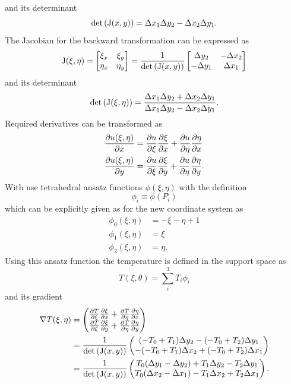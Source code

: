 and its determinant
\begin{equation}
	\det\left(\mathrm{J}(x, y)\right) = \Delta x_1 \Delta y_2 - \Delta x_2 \Delta y_1.
\end{equation}
The Jacobian for the backward transformation can be expressed as
\begin{equation}
	\mathrm{J}(\xi, \eta) = 
	\begin{bmatrix}
	\xi_{x} & \xi_{y} \\
	\eta_{x} & \eta_{y}
	\end{bmatrix}
	= \frac{1}{\det\left(\mathrm{J}(x,y)\right)}
	\begin{bmatrix}
	\Delta y_{2} & -\Delta x_{2}\\
	-\Delta y_{1} & \Delta x_{1}
	\end{bmatrix}
\end{equation}
and its determinant
\begin{equation}
	\det\left( \mathrm{J}(\xi, \eta) \right) = \frac{\Delta x_1 \Delta y_2 + \Delta x_2 \Delta y_1}{\Delta x_1 \Delta y_2 - \Delta x_2 \Delta y_1}.
\end{equation}
Required derivatives can be transformed as
\begin{align}
	\pdv{u(\xi, \eta)}{x} &= \pdv{u}{\xi}\pdv{\xi}{x} + \pdv{u}{\eta}\pdv{\eta}{x}\\
	\pdv{u(\xi, \eta)}{y} &= \pdv{u}{\xi}\pdv{\xi}{y} + \pdv{u}{\eta}\pdv{\eta}{y}.
\end{align}
With use tetrahedral ansatz functions $\phi(\xi, \eta)$ with the definition
\begin{equation}
	\phi_i \equiv \phi(P_i)
\end{equation}
which can be explicitly given as for the new coordinate system as
\begin{align}
	\phi_0(\xi, \eta) &= -\xi - \eta  + 1\\
	\phi_1(\xi, \eta) &= \xi\\
	\phi_2(\xi, \eta) &= \eta.
\end{align}
Using this ansatz function the temperature is defined in the support space as
\begin{equation}
	T(\xi, \theta)  = \sum_i^3 T_i \phi_i
\end{equation}
and its gradient
\begin{align}
	\nabla T(\xi, \eta) &=
	\begin{pmatrix}
	\pdv{T}{\xi}\pdv{\xi}{x} + \pdv{T}{\eta}\pdv{\eta}{x}\\
	\pdv{T}{\xi}\pdv{\xi}{y} + \pdv{T}{\eta}\pdv{\eta}{y}
	\end{pmatrix}\\
	&= \frac{1}{\det\left(\mathrm{J}(x,y)\right)}
	\begin{pmatrix}
	(-T_0 + T_1)\Delta y_2 - (-T_0 + T_2)\Delta y_1\\
	-(-T_0 + T_1)\Delta x_2 + (-T_0 + T_2)\Delta x_1
	\end{pmatrix}\\
	&= \frac{1}{\det\left(\mathrm{J}(x,y)\right)}
	\begin{pmatrix}
	T_0(\Delta y_1 - \Delta y_2) + T_1\Delta y_2 - T_2\Delta y_1\\
	T_0(\Delta x_2 - \Delta x_1) - T_1 \Delta x_2 + T_2 \Delta x_1
	\end{pmatrix}.
\end{align}